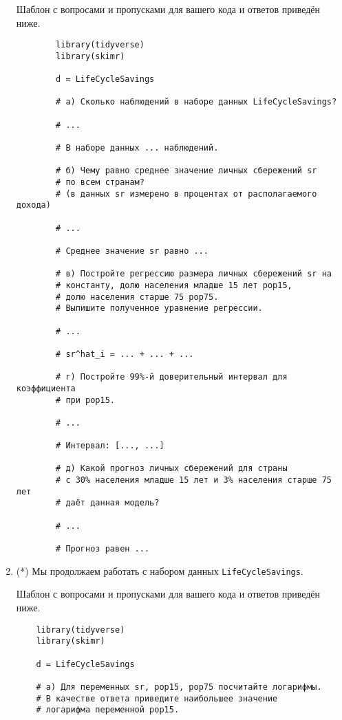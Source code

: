 \documentclass[12pt]{article}
\begin{document}
\begin{enumerate}
    Шаблон с вопросами и пропусками для вашего кода и ответов приведён ниже. 

    \begin{verbatim}
        library(tidyverse)
        library(skimr)

        d = LifeCycleSavings

        # а) Сколько наблюдений в наборе данных LifeCycleSavings?

        # ...

        # В наборе данных ... наблюдений.

        # б) Чему равно среднее значение личных сбережений sr 
        # по всем странам? 
        # (в данных sr измерено в процентах от располагаемого дохода)

        # ...

        # Среднее значение sr равно ... 

        # в) Постройте регрессию размера личных сбережений sr на 
        # константу, долю населения младше 15 лет pop15, 
        # долю населения старше 75 pop75.
        # Выпишите полученное уравнение регрессии. 

        # ...

        # sr^hat_i = ... + ... + ... 

        # г) Постройте 99%-й доверительный интервал для коэффициента 
        # при pop15. 

        # ...

        # Интервал: [..., ...]

        # д) Какой прогноз личных сбережений для страны 
        # с 30% населения младше 15 лет и 3% населения старше 75 лет
        # даёт данная модель?

        # ...

        # Прогноз равен ...
    \end{verbatim}

    \newpage
\item (*) Мы продолжаем работать с набором данных \verb|LifeCycleSavings|.

Шаблон с вопросами и пропусками для вашего кода и ответов приведён ниже. 

\begin{verbatim}
    library(tidyverse)
    library(skimr)

    d = LifeCycleSavings

    # а) Для переменных sr, pop15, pop75 посчитайте логарифмы. 
    # В качестве ответа приведите наибольшее значение 
    # логарифма переменной pop15.


\end{verbatim}
\end{enumerate}
\end{document}
